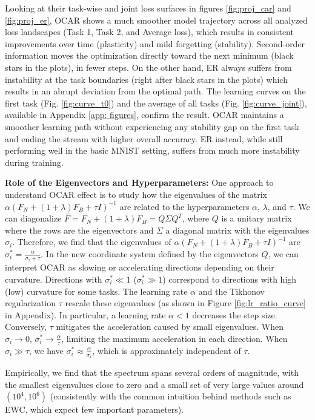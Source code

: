 Looking at their task-wise and joint loss surfaces in figures \ref{fig:proj_car} and \ref{fig:proj_er}, OCAR shows a much smoother model trajectory across all analyzed loss landscapes (Task 1, Task 2, and Average loss), which results in consistent improvements over time (plasticity) and mild forgetting (stability). Second-order information moves the optimization directly toward the next minimum (black stars in the plots), in fewer steps. On the other hand, ER always suffers from instability at the task boundaries (right after black stars in the plots) which results in an abrupt deviation from the optimal path. The learning curves on the first task (Fig. \ref{fig:curve_t0}) and the average of all tasks (Fig. \ref{fig:curve_joint}), available in Appendix \ref{app: figures}, confirm the result. OCAR maintains a smoother learning path without experiencing any stability gap on the first task and ending the stream with higher overall accuracy. ER instead, while still performing well in the basic MNIST setting, suffers from much more instability during training.

\textbf{Role of the Eigenvectors and Hyperparameters:} One approach to understand OCAR effect is to study how the eigenvalues of the matrix $\alpha (F_N + (1 + \lambda) F_B + \tau I)^{-1}$ are related to the hyperparameters $\alpha$, $\lambda$, and $\tau$. We can diagonalize  $\bar{F} = F_N + (1 + \lambda) F_B = Q \Sigma Q^T$, where $Q$ is a unitary matrix where the rows are the eigenvectors and $\Sigma$ a diagonal matrix with the eigenvalues $\sigma_i$. Therefore, we find that the eigenvalues of $\alpha (F_N + (1 + \lambda) F_B + \tau I)^{-1}$ are 
$\sigma_i^* = \frac{\alpha}{\sigma_i + \tau}.$
In the new coordinate system defined by the eigenvectors $Q$, we can interpret OCAR as slowing or accelerating directions depending on their curvature. Directions with $\sigma^*_i \ll 1$ ($\sigma^*_i \gg 1$) correspond to directions with high (low) curvature for some tasks.
The learning rate $\alpha$ and the Tikhonov regularization $\tau$ rescale these eigenvalues (as shown in Figure \ref{fig:lr_ratio_curve} in Appendix).  In particular, a learning rate $\alpha < 1$ decreases the step size. Conversely, $\tau$ mitigates the acceleration caused by small eigenvalues. When $\sigma_i \rightarrow 0$,  $\sigma^*_i \rightarrow \frac{\alpha}{\tau}$, limiting the maximum acceleration in each direction. When $\sigma_i \gg \tau$, we have $\sigma^*_i \approx \frac{\alpha}{\sigma_i}$, which is approximately independent of $\tau$.

Empirically, we find that the spectrum spans several orders of magnitude, with the smallest eigenvalues close to zero and a small set of very large values around $(10^4, 10^6)$ (consistently with the common intuition behind methods such as EWC, which expect few important parameters).  %

